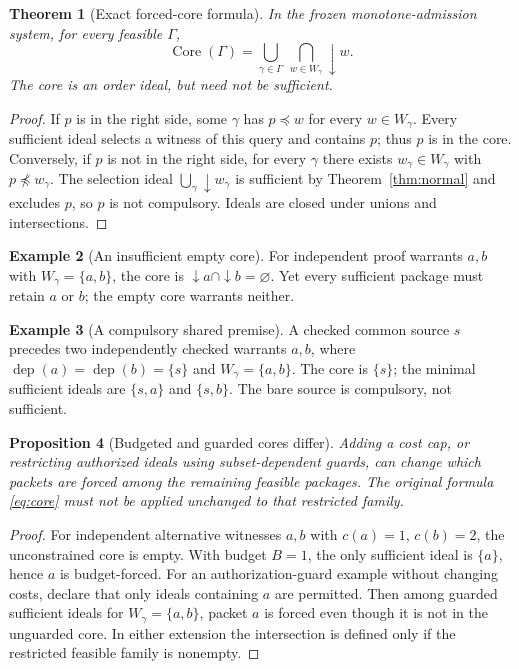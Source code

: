 \documentclass[10pt,letterpaper]{article}
\newtheorem{theorem}{Theorem}[section]
\newtheorem{proposition}[theorem]{Proposition}
\theoremstyle{definition}
\newtheorem{example}[theorem]{Example}
\theoremstyle{remark}
\newcommand{\dep}{\operatorname{dep}}
\newcommand{\Core}{\operatorname{Core}}
\begin{document}
\begin{theorem}[Exact forced-core formula]\label{thm:core}
In the frozen monotone-admission system, for every feasible $\Gamma$,
\begin{equation}\label{eq:core}
\boxed{\displaystyle\Core(\Gamma)=\bigcup_{\gamma\in\Gamma}\ \bigcap_{w\in W_\gamma}\downarrow w.}
\end{equation}
The core is an order ideal, but need not be sufficient.
\end{theorem}
\begin{proof}
If $p$ is in the right side, some $\gamma$ has $p\preceq w$ for every $w\in W_\gamma$. Every sufficient ideal selects a witness of this query and contains $p$; thus $p$ is in the core. Conversely, if $p$ is not in the right side, for every $\gamma$ there exists $w_\gamma\in W_\gamma$ with $p\not\preceq w_\gamma$. The selection ideal $\bigcup_\gamma\downarrow w_\gamma$ is sufficient by Theorem~\ref{thm:normal} and excludes $p$, so $p$ is not compulsory. Ideals are closed under unions and intersections.\end{proof}

\begin{example}[An insufficient empty core]
For independent proof warrants $a,b$ with $W_\gamma=\{a,b\}$, the core is $\downarrow a\cap\downarrow b=\varnothing$. Yet every sufficient package must retain $a$ or $b$; the empty core warrants neither.
\end{example}

\begin{example}[A compulsory shared premise]
A checked common source $s$ precedes two independently checked warrants $a,b$, where $\dep(a)=\dep(b)=\{s\}$ and $W_\gamma=\{a,b\}$. The core is $\{s\}$; the minimal sufficient ideals are $\{s,a\}$ and $\{s,b\}$. The bare source is compulsory, not sufficient.
\end{example}

\begin{proposition}[Budgeted and guarded cores differ]\label{prop:budgetcore}
Adding a cost cap, or restricting authorized ideals using subset-dependent guards, can change which packets are forced among the remaining feasible packages. The original formula \eqref{eq:core} must not be applied unchanged to that restricted family.
\end{proposition}
\begin{proof}
For independent alternative witnesses $a,b$ with $c(a)=1$, $c(b)=2$, the unconstrained core is empty. With budget $B=1$, the only sufficient ideal is $\{a\}$, hence $a$ is budget-forced. For an authorization-guard example without changing costs, declare that only ideals containing $a$ are permitted. Then among guarded sufficient ideals for $W_\gamma=\{a,b\}$, packet $a$ is forced even though it is not in the unguarded core. In either extension the intersection is defined only if the restricted feasible family is nonempty.
\end{proof}
\end{document}
